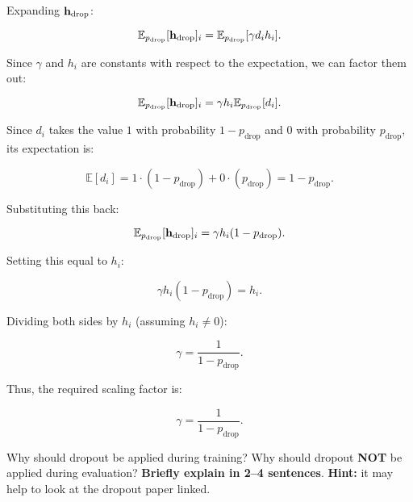 \begin{parts}
\begin{subparts}
{                Expanding $\mathbf{h}_{\text{drop}}$:

                \[
                \mathbb{E}_{p_{\text{drop}}}[\mathbf{h}_{\text{drop}}]_i = \mathbb{E}_{p_{\text{drop}}}[\gamma d_i h_i].
                \]

                Since $\gamma$ and $h_i$ are constants with respect to the expectation, we can factor them out:

                \[
                \mathbb{E}_{p_{\text{drop}}}[\mathbf{h}_{\text{drop}}]_i = \gamma h_i \mathbb{E}_{p_{\text{drop}}}[d_i].
                \]

                Since $d_i$ takes the value $1$ with probability $1 - p_{\text{drop}}$ and $0$ with probability $p_{\text{drop}}$, its expectation is:

                \[
                \mathbb{E}[d_i] = 1 \cdot (1 - p_{\text{drop}}) + 0 \cdot (p_{\text{drop}}) = 1 - p_{\text{drop}}.
                \]

                Substituting this back:

                \[
                \mathbb{E}_{p_{\text{drop}}}[\mathbf{h}_{\text{drop}}]_i = \gamma h_i (1 - p_{\text{drop}}).
                \]

                Setting this equal to $h_i$:

                \[
                \gamma h_i (1 - p_{\text{drop}}) = h_i.
                \]

                Dividing both sides by $h_i$ (assuming $h_i \neq 0$):

                \[
                \gamma = \frac{1}{1 - p_{\text{drop}}}.
                \]

                Thus, the required scaling factor is:

                \[
                \gamma = \frac{1}{1 - p_{\text{drop}}}.
                \]

            }
            
          \subpart[2] Why should dropout be applied during training? Why should dropout \textbf{NOT} be applied during evaluation? \textbf{Briefly explain in 2--4 sentences}. \textbf{Hint:} it may help to look at the dropout paper linked. \newline

\end{subparts}
\end{parts}
